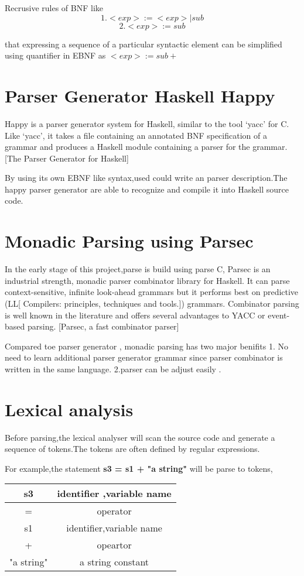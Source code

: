 Recrusive rules of BNF  like 
\[   1. <exp> := <exp> | sub \]
\[	 2. <exp> := sub     \]
 
that expressing a sequence of a particular syntactic element can be simplified using quantifier in EBNF as $ <exp>:=sub+ $



\section{Parser Generator Haskell Happy}
Happy is a parser generator system for Haskell, similar to the tool `yacc' for C. Like `yacc', it takes a file containing an annotated BNF specification of a grammar and produces a Haskell module containing a parser for the grammar.
[The Parser Generator for Haskell] 

By using its own EBNF like syntax,used could write an parser description.The happy parser generator are able to recognize and compile it into Haskell source code.


\section{Monadic Parsing using Parsec}
In the early stage of this project,parse is build using parse C,
Parsec is an industrial strength, monadic parser combinator library for Haskell. It can parse context-sensitive, infinite look-ahead grammars but it performs best on
predictive (LL[ Compilers: principles, techniques and tools.]) grammars. Combinator parsing is well known in the literature
and offers several advantages to YACC or event-based parsing. [Parsec, a fast combinator parser] 

Compared toe parser generator , monadic parsing has two major benifits
1. No need to learn additional parser generator grammar since parser combinator is written in the same language. 2.parser can be adjust easily .




\section {Lexical analysis}
Before parsing,the lexical analyser will scan the source code and generate a sequence of tokens.The tokens are often defined by regular expressions.

For example,the statement \textbf{s3 = s1 + "a string"} will be parse to tokens,

\begin{tabular}{|c|c|}
\hline s3 & identifier ,variable name \\ 
\hline = & operator \\ 
\hline s1 & identifier,variable name \\ 
\hline + & opeartor \\ 
\hline "a string" & a string constant \\ 
\hline 
\end{tabular} 

